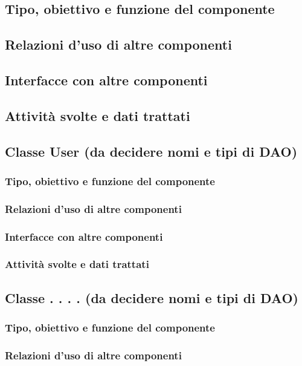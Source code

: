 \subsection*{Tipo, obiettivo e funzione del componente}
\subsection*{Relazioni d'uso di altre componenti}
\subsection*{Interfacce con altre componenti}
\subsection*{Attivit\`a svolte e dati trattati}

\subsection{Classe User (da decidere nomi e tipi di DAO)}
\subsubsection*{Tipo, obiettivo e funzione del componente}
\subsubsection*{Relazioni d'uso di altre componenti}
\subsubsection*{Interfacce con altre componenti}
\subsubsection*{Attivit\`a svolte e dati trattati}

\subsection{Classe . . . . (da decidere nomi e tipi di DAO)}
\subsubsection*{Tipo, obiettivo e funzione del componente}
\subsubsection*{Relazioni d'uso di altre componenti}
